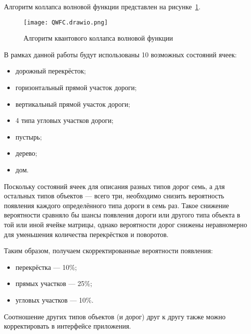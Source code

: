 Алгоритм коллапса волновой функции представлен на рисунке~\ref{fig:QWFC}.

\newpage

\begin{figure}[h!]
    \centering
    \texttt{[image: QWFC.drawio.png]}
    \caption{Алгоритм квантового коллапса волновой функции}
    \label{fig:QWFC}
\end{figure}

В рамках данной работы будут использованы 10 возможных состояний ячеек:

\begin{itemize}
    \item дорожный перекрёсток;
    \item горизонтальный прямой участок дороги;
    \item вертикальный прямой участок дороги;
    \item 4 типа угловых участков дороги;
    \item пустырь;
    \item дерево;
    \item дом.
\end{itemize}

Поскольку состояний ячеек для описания разных типов дорог семь, а для остальных типов объектов --- всего три, необходимо снизить вероятность появления каждого определённого типа дороги в семь раз. Такое снижение вероятности сравняло бы шансы появления дороги или другого типа объекта в той или иной ячейке матрицы, однако вероятности дорог снижены неравномерно для уменьшения количества перекрёстков и поворотов.

Таким образом, получаем скорректированные вероятности появления:
\begin{itemize}
    \item перекрёстка --- 10\%;
    \item прямых участков --- 25\%;
    \item угловых участков --- 10\%.
\end{itemize}

Соотношение других типов объектов (и дорог) друг к другу также можно корректировать в интерфейсе приложения.
